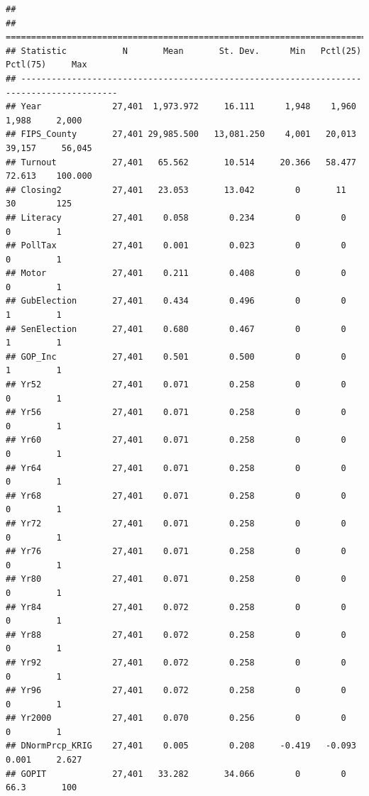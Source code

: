 \documentclass[]{book}
\begin{document}
\begin{verbatim}
## 
## =========================================================================================
## Statistic           N       Mean       St. Dev.      Min   Pctl(25)  Pctl(75)     Max    
## -----------------------------------------------------------------------------------------
## Year              27,401  1,973.972     16.111      1,948    1,960     1,988     2,000   
## FIPS_County       27,401 29,985.500   13,081.250    4,001   20,013    39,157     56,045  
## Turnout           27,401   65.562       10.514     20.366   58.477    72.613    100.000  
## Closing2          27,401   23.053       13.042        0       11        30        125    
## Literacy          27,401    0.058        0.234        0        0         0         1     
## PollTax           27,401    0.001        0.023        0        0         0         1     
## Motor             27,401    0.211        0.408        0        0         0         1     
## GubElection       27,401    0.434        0.496        0        0         1         1     
## SenElection       27,401    0.680        0.467        0        0         1         1     
## GOP_Inc           27,401    0.501        0.500        0        0         1         1     
## Yr52              27,401    0.071        0.258        0        0         0         1     
## Yr56              27,401    0.071        0.258        0        0         0         1     
## Yr60              27,401    0.071        0.258        0        0         0         1     
## Yr64              27,401    0.071        0.258        0        0         0         1     
## Yr68              27,401    0.071        0.258        0        0         0         1     
## Yr72              27,401    0.071        0.258        0        0         0         1     
## Yr76              27,401    0.071        0.258        0        0         0         1     
## Yr80              27,401    0.071        0.258        0        0         0         1     
## Yr84              27,401    0.072        0.258        0        0         0         1     
## Yr88              27,401    0.072        0.258        0        0         0         1     
## Yr92              27,401    0.072        0.258        0        0         0         1     
## Yr96              27,401    0.072        0.258        0        0         0         1     
## Yr2000            27,401    0.070        0.256        0        0         0         1     
## DNormPrcp_KRIG    27,401    0.005        0.208     -0.419   -0.093     0.001     2.627   
## GOPIT             27,401   33.282       34.066        0        0       66.3       100    

\end{verbatim}
\end{document}
